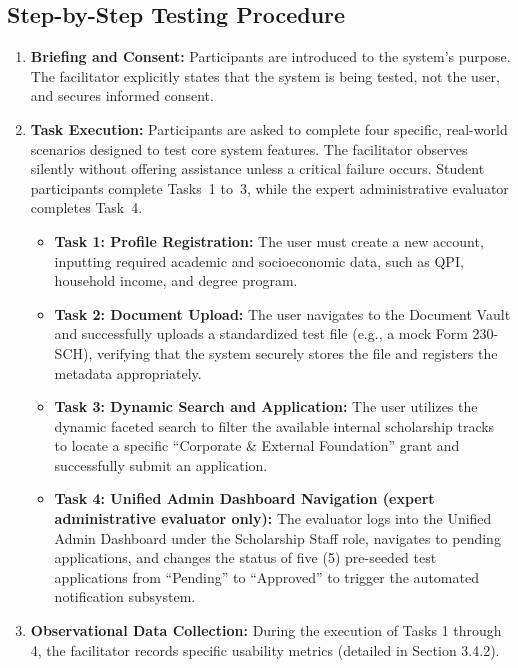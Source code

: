 \subsection{Step-by-Step Testing Procedure}

\begin{enumerate}
  \item \textbf{Briefing and Consent:} Participants are introduced to the system's purpose. The facilitator explicitly states that the system is being tested, not the user, and secures informed consent.
  \item \textbf{Task Execution:} Participants are asked to complete four specific, real-world scenarios designed to test core system features. The facilitator observes silently without offering assistance unless a critical failure occurs.
  Student participants complete Tasks~1 to~3, while the expert
  administrative evaluator completes Task~4.
  \begin{itemize}
    \item \textbf{Task 1: Profile Registration:} The user must create a new account, inputting required academic and socioeconomic data, such as QPI, household income, and degree program.
    \item \textbf{Task 2: Document Upload:} The user navigates to the Document Vault and successfully uploads a standardized test file (e.g., a mock Form 230-SCH), verifying that the system securely stores the file and registers the metadata appropriately.
    \item \textbf{Task 3: Dynamic Search and Application:} The user utilizes the dynamic faceted search to filter the available internal scholarship tracks to locate a specific ``Corporate \& External Foundation'' grant and successfully submit an application.
    \item \textbf{Task 4: Unified Admin Dashboard Navigation (expert
    administrative evaluator only):} The evaluator logs into the Unified
    Admin Dashboard under the Scholarship Staff role, navigates to pending
    applications, and changes the status of five (5) pre-seeded test
    applications from ``Pending'' to ``Approved'' to trigger the automated
    notification subsystem.
  \end{itemize}
  \item \textbf{Observational Data Collection:} During the execution of Tasks 1 through 4, the facilitator records specific usability metrics (detailed in Section 3.4.2).

\end{enumerate}
